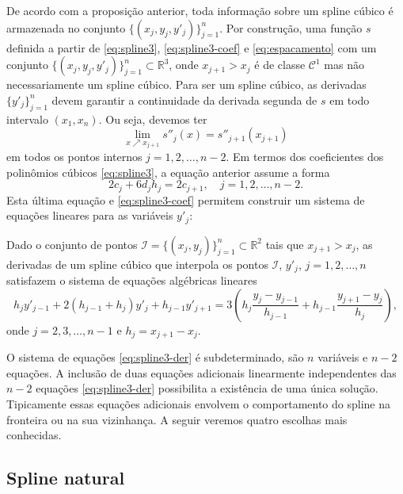 De acordo com a proposição anterior, toda informação sobre um spline cúbico é armazenada no conjunto $\{(x_j,y_j,y'_j)\}_{j=1}^n$. Por construção, uma função $s$ definida a partir de \eqref{eq:spline3}, \eqref{eq:spline3-coef} e \eqref{eq:espacamento} com um conjunto $\{(x_j,y_j,y'_j)\}_{j=1}^n\subset\mathbb{R}^3$, onde $x_{j+1}>x_j$ é de classe $\mathcal{C}^1$ mas não necessariamente um spline cúbico. Para ser um spline cúbico, as derivadas $\{y'_j\}_{j=1}^n$ devem garantir a continuidade da derivada segunda de $s$ em todo intervalo $(x_1,x_n)$. Ou seja, devemos ter 
\begin{equation*}
\lim\limits_{x\nearrow x_{j+1} }s''_j(x)=s''_{j+1}(x_{j+1})
\end{equation*}
em todos os pontos internos $j=1,2,\ldots,n-2$.  Em termos dos coeficientes dos polinômios cúbicos \eqref{eq:spline3}, a equação anterior assume a forma
\begin{equation*}
2c_j+6d_jh_j=2c_{j+1},\quad j=1,2,\ldots,n-2.
\end{equation*} 
Esta última equação e \eqref{eq:spline3-coef} permitem construir um sistema de equações lineares para as variáveis $y'_j$:
\begin{prop} Dado o conjunto de pontos $\mathcal{I}=\{(x_j,y_j)\}_{j=1}^n\subset\mathbb{R}^2$ tais que $x_{j+1}>x_j$, as derivadas de um spline cúbico que interpola os pontos $\mathcal{I}$, $y'_j$, $j=1,2,\ldots,n$ satisfazem o sistema de equações algébricas lineares   
\begin{equation}\label{eq:spline3-der}
h_jy'_{j-1}+2(h_{j-1}+h_j)y'_j+h_{j-1}y'_{j+1}=3\left(h_j\dfrac{y_j-y_{j-1}}{h_{j-1}}+h_{j-1}\dfrac{y_{j+1}-y_j}{h_j}\right),
\end{equation}
onde $j=2,3,\ldots,n-1$ e $h_j=x_{j+1}-x_j$.
\end{prop}
O sistema de equações \eqref{eq:spline3-der} é subdeterminado, são $n$ variáveis e $n-2$ equações. A inclusão de duas equações adicionais linearmente independentes das $n-2$ equações \eqref{eq:spline3-der} possibilita a existência de uma única solução. Tipicamente essas equações adicionais envolvem o comportamento do spline na fronteira ou na sua vizinhança.  A seguir veremos quatro escolhas mais conhecidas.


\subsection{Spline natural}

